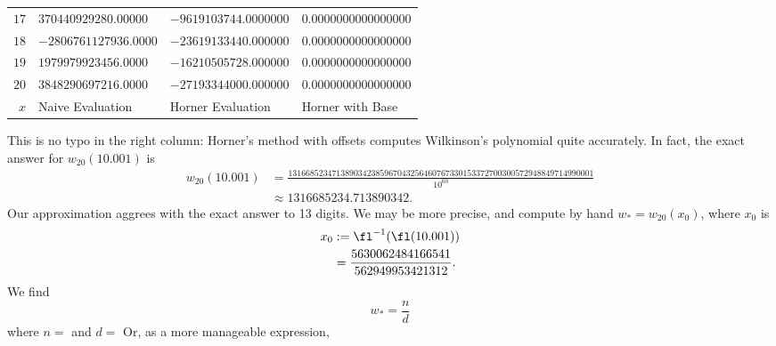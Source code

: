 \begin{ex}
\begin{center}
\begin{longtable}{r|l|l|l}
$17$ &$370440929280.00000$ &$-9619103744.0000000$ &$0.0000000000000000$ \\
$18$ &$-2806761127936.0000$ &$-23619133440.000000$ &$0.0000000000000000$ \\
$19$ &$1979979923456.0000$ &$-16210505728.000000$ &$0.0000000000000000$ \\
$20$ &$3848290697216.0000$ &$-27193344000.000000$ &$0.0000000000000000$ \\
 \hline
$x$ & Naive Evaluation & Horner Evaluation & Horner with Base
 \end{longtable}
  \end{center}
This is no typo in the right column: Horner's method with offsets
computes Wilkinson's polynomial quite accurately. In fact, the exact
answer for $w_{20}(10.001)$ is
\begin{align}
  w_{20}(10.001) &= \frac{1316685234713890342385967043256460767330153372700300572948849714990001}
    {10^{60}}\nonumber\\
    &\approx 1316685234.713890342.
\end{align}
  Our approximation aggrees with the exact answer to 13 digits. We may
  be more precise, and compute by hand $w_{*}=w_{20}(x_{0})$, where
  $x_{0}$ is
  \begin{equation}
    \begin{split}
      x_{0}&:= \fl^{-1}(\fl(10.001))\\
      &=\frac{5630062484166541}{562949953421312}.
    \end{split}
  \end{equation}
  We find
  \begin{equation}
    w_{*} = \frac{n}{d}
  \end{equation}
  where
  \medbreak
  \begingroup
\noindent $n =$ 
\endgroup
\medbreak
\noindent and
\medbreak
  \begingroup
\noindent $d =$ 
  \endgroup
  \medbreak\noindent%
Or, as a more manageable expression,
  \begin{equation}

\end{equation}
\end{ex}
